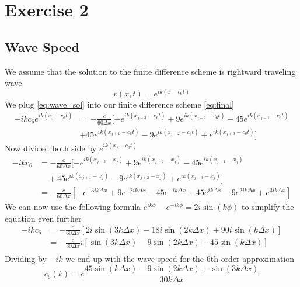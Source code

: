 \section*{Exercise 2}
\subsection*{Wave Speed}
We assume that the solution to the finite difference scheme is rightward traveling wave
\begin{equation}
	v(x,t) = e^{ik(x-c_6t)}
	\label{eq:wave_sol}
\end{equation}
We plug \eqref{eq:wave_sol} into our finite difference scheme \eqref{eq:final}
\begin{equation}
	\begin{aligned}
		-ikc_6 e^{ik(x_j-c_6t)} & = -\frac{c}{60 \Delta x} [-e^{ik(x_{j-3}-c_6t)} + 9e^{ik(x_{j-2}-c_6t)} -45 e^{ik(x_{j-1}-c_6t)} \\
		                        & + 45e^{ik(x_{j+1}-c_6t)}-9e^{ik(x_{j+2}-c_6t)} + e^{ik(x_{j+3}-c_6t)} ]
	\end{aligned}
	\label{eq:wave_scheme}
\end{equation}
Now divided both side by $ e^{ik(x_j-c_6t)}$
\begin{equation}
	\begin{aligned}
		-ikc_6 & = -\frac{c}{60 \Delta x} [-e^{ik(x_{j-3}-x_j)} + 9e^{ik(x_{j-2}-x_j)} -45 e^{ik(x_{j-1}-x_j)}                                                                \\
		       & \quad + 45e^{ik(x_{j+1}-x_j)}-9e^{ik(x_{j+2}-x_j)} + e^{ik(x_{j+3}-x_j)} ]                                                                                   \\
		       & = -\frac{c}{60 \Delta x} \left [-e^{-3ik \Delta x} + 9e^{-2ik\Delta x} -45 e^{-ik \Delta x} + 45e^{ik\Delta x} -9e^{2ik \Delta x} + e^{3ik\Delta x} \right ]
	\end{aligned}
\end{equation}
We can now use the following formula $e^{ik \phi} - e^{-ik \phi} = 2i \sin (k \phi)$ to simplify the equation even further
\begin{equation}
	\begin{aligned}
		-ikc_6 & =  -\frac{c}{60 \Delta x} \left [ 2i \sin (3k \Delta x ) - 18i \sin (2k \Delta x) + 90i \sin (k \Delta x) \right] \\
		       & = -\frac{c}{30 \Delta x}i  \left [ \sin (3k \Delta x) - 9 \sin (2k \Delta x) + 45 \sin (k \Delta x) \right]       \\
	\end{aligned}
	\label{eq:pairs}
\end{equation}
Dividing by $-ik$ we end up with the wave speed for the 6th order approximation
\begin{equation}
	c_6(k) = c\frac{45 \sin (k \Delta x) - 9 \sin (2k \Delta x) + \sin (3k \Delta x) }{30 k\Delta x}
	\label{eq:wave_speed}
\end{equation}
